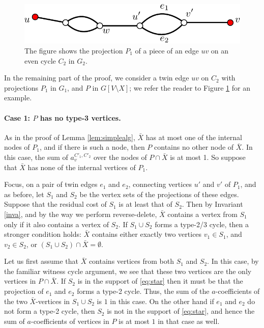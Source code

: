\documentclass{article}
\newcommand{\0}{\mathbb{0}}
\newcommand{\1}{\mathbb{1}}
\begin{document}
\begin{figure}
  \begin{center}
    \includegraphics[width=.5\textwidth]{piece.pdf}
  \end{center}  
  \caption{\label{fig:piece} The figure shows the projection $P_1$ of a piece of an
  edge $uv$ on an even
  cycle $C_2$ in $G_2$.}
\end{figure}  

In the remaining part of the proof, we consider a twin edge $uv$ on $C_2$ with
projections $P_1$ in $G_1$, and $P$ in $G[V\setminus X]$; we refer the reader
to Figure \ref{fig:piece} for an example.

\paragraph{Case 1: $P$ has no type-3 vertices.}

As in the proof of Lemma
\ref{lem:simplealg}, $\bar{X}$ has at most one of the internal nodes of $P_1$, and if
there is such a node, then $P$ contains no other node of $\bar{X}$. In this case, 
the sum of $a^{C'_1,C'_2}_v$ over the nodes of $P \cap \bar{X}$ is at most 1.
So suppose that $\bar{X}$ has none of the internal vertices of $P_1$. 

Focus, on a pair of twin edges $e_1$ and $e_2$, connecting vertices $u'$ and
$v'$ of $P_1$, and as before, let $S_1$ and $S_2$ be the vertex sets of the
projections of these edges.  Suppose that the residual cost of $S_1$ is at
least that of $S_2$. Then by Invariant \ref{inva}, and by the way we perform
reverse-delete, $\bar{X}$ contains a vertex from $S_1$
only if it also contains a vertex of $S_2$. If $S_1 \cup S_2$ forms a type-2/3 cycle, then
a stronger condition holds: $\bar{X}$ contains either exactly two vertices $v_1 \in S_1$,
and $v_2 \in S_2$, or $(S_1 \cup S_2)\cap \bar{X}=\emptyset$. 

Let us first assume that $\bar{X}$ contains
vertices from both $S_1$ and $S_2$. In this case, by the familiar witness cycle
argument, we see that these two vertices are the only vertices in $P \cap
\bar{X}$. If $S_2$ is in the support of \eqref{eq:star} then it must be that
the projection of $e_1$ and $e_2$ forms a type-2 cycle. Thus, the sum of the
$a$-coefficients of the two $\bar{X}$-vertices in $S_1 \cup S_2$ is $1$ in
this case. On the other hand if $e_1$ and $e_2$ do not form a type-2 cycle,
then $S_2$ is not in the support of \eqref{eq:star}, and hence the sum of
$a$-coefficients of vertices in $P$ is at most $1$ in that case as well. 
\end{document}
